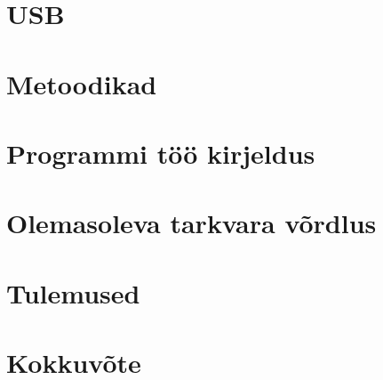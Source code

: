 \documentclass[12pt, a4paper]{report}
\begin{document}
\chapter{USB}\label{chapter:usb}


\chapter{Metoodikad}\label{chapter:metoodika}


\chapter{Programmi töö kirjeldus}\label{chapter:kirjeldus}


\chapter{Olemasoleva tarkvara võrdlus}\label{chapter:soft}


\chapter{Tulemused}\label{chapter:tulemused}


\chapter{Kokkuvõte}\label{chapter:summary} 


\pagebreak
{}
\renewcommand{\bibname}{Kasutatud kirjandus}
\printbibliography



\end{document}
